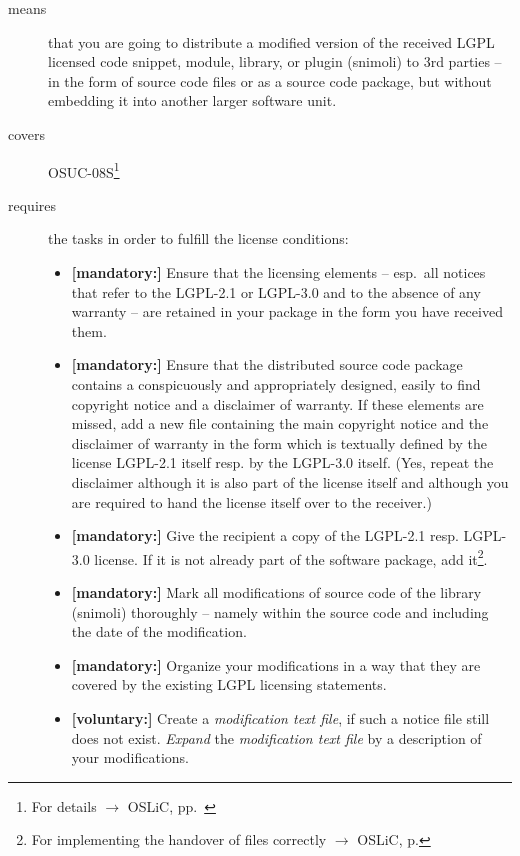 \begin{description}
\item[means] that you are going to distribute a modified version of the received
LGPL licensed code snippet, module, library, or plugin (snimoli) to 3rd parties
-- in the form of source code files or as a source code package, but without
embedding it into another larger software unit.
\item[covers] OSUC-08S\footnote{For details $\rightarrow$ OSLiC, pp.\
\pageref{OSUC-08S-DEF}}
\item[requires] the tasks in order to fulfill the license conditions:
\begin{itemize}
 
   \item \textbf{[mandatory:]} Ensure that the licensing elements -- esp.\ all
  notices that refer to the LGPL-2.1 or LGPL-3.0 and to the absence of any
  warranty -- are retained in your package in the form you have received them.

  \item \textbf{[mandatory:]} Ensure that the distributed source code package
  contains a conspicuously and appropriately designed, easily to find copyright
  notice and a disclaimer of warranty. If these elements are missed, add a new
  file containing the main copyright notice and the disclaimer of warranty in the
  form which is textually defined by the license LGPL-2.1 itself resp. by the
  LGPL-3.0 itself. (Yes, repeat the disclaimer although it is also part of the
  license itself and although you are required to hand the license itself over
  to the receiver.)
  
  \item \textbf{[mandatory:]} Give the recipient a copy of the LGPL-2.1 resp.
  LGPL-3.0 license. If it is not already part of the software package, add
  it\footnote{For implementing the handover of files correctly $\rightarrow$
  OSLiC, p. \pageref{DistributingFilesHint}}.
  
  \item \textbf{[mandatory:]} Mark all modifications of source code of the
  library (snimoli) thoroughly -- namely within the source code and including
  the date of the modification.
  
  \item \textbf{[mandatory:]} Organize your modifications in a way that they are
  covered by the existing LGPL licensing statements.
    
  \item \textbf{[voluntary:]} Create a \emph{modification text file}, if such a
  notice file still does not exist. \emph{Expand} the \emph{modification text
  file} by a description of your modifications.
  

\end{itemize}
\end{description}
